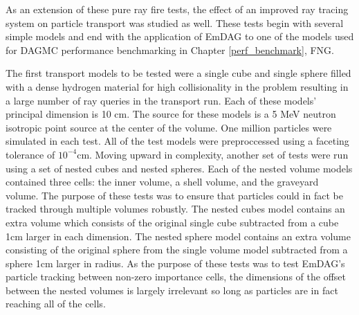 \documentclass[12pt, a4paper]{article}
\begin{document}
As an extension of these pure ray fire tests, the effect of an improved ray tracing system on particle transport was studied as well. These tests begin with several simple models and end with the application of EmDAG to one of the models used for DAGMC performance benchmarking in Chapter \ref{perf_benchmark}, FNG.

The first transport models to be tested were a single cube and single sphere filled with a dense hydrogen material for high collisionality in the problem resulting in a large number of ray queries in the transport run. Each of these models' principal dimension is 10 cm. The source for these models is a 5 MeV neutron isotropic point source at the center of the volume. One million particles were simulated in each test. All of the test models were preproccessed using a faceting tolerance of $10^{-4}$cm. Moving upward in complexity, another set of tests were run using a set of nested cubes and nested spheres. Each of the nested volume models contained three cells: the inner volume, a shell volume, and the graveyard volume. The purpose of these tests was to ensure that particles could in fact be tracked through multiple volumes robustly. The nested cubes model contains an extra volume which consists of the original single cube subtracted from a cube 1cm larger in each dimension. The nested sphere model contains an extra volume consisting of the original sphere from the single volume model subtracted from a sphere 1cm larger in radius. As the purpose of these tests was to test EmDAG's particle tracking between non-zero importance cells, the dimensions of the offset between the nested volumes is largely irrelevant so long as particles are in fact reaching all of the cells.
\end{document}
